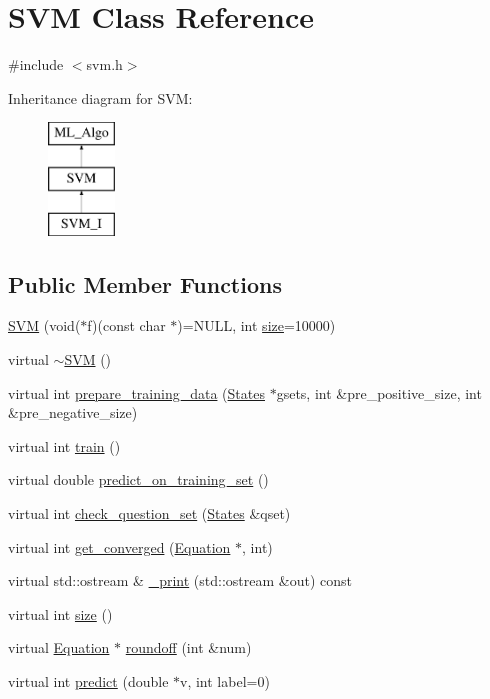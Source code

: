 \hypertarget{classSVM}{}\section{S\+VM Class Reference}
\label{classSVM}


{\ttfamily \#include $<$svm.\+h$>$}

Inheritance diagram for S\+VM\+:\begin{figure}[H]
\begin{center}
\leavevmode
\includegraphics[height=3.000000cm]{classSVM}
\end{center}
\end{figure}
\subsection*{Public Member Functions}
\begin{DoxyCompactItemize}
\item 
\hyperlink{classSVM_ad8716b6d07bd35810f62662856af3a09}{S\+VM} (void($\ast$f)(const char $\ast$)=N\+U\+LL, int \hyperlink{classSVM_a4563cef982f6e1c67acf0c7b0ec8909b}{size}=10000)
\item 
virtual \hyperlink{classSVM_ad2a87ef0f940145f04150e9561f10478}{$\sim$\+S\+VM} ()
\item 
virtual int \hyperlink{classSVM_a930fe217e3affd64acb6700f5f8082e1}{prepare\+\_\+training\+\_\+data} (\hyperlink{classStates}{States} $\ast$gsets, int \&pre\+\_\+positive\+\_\+size, int \&pre\+\_\+negative\+\_\+size)
\item 
virtual int \hyperlink{classSVM_a6a1d895b86522eab683d66ded4d3a049}{train} ()
\item 
virtual double \hyperlink{classSVM_af208fc653a382591f20c0fcf7a186362}{predict\+\_\+on\+\_\+training\+\_\+set} ()
\item 
virtual int \hyperlink{classSVM_aa610ec08173c8603ad6e02f26cbe8e1c}{check\+\_\+question\+\_\+set} (\hyperlink{classStates}{States} \&qset)
\item 
virtual int \hyperlink{classSVM_a712dcd7cb65a8045a77dd474869dd5c4}{get\+\_\+converged} (\hyperlink{classEquation}{Equation} $\ast$, int)
\item 
virtual std\+::ostream \& \hyperlink{classSVM_a6e5a3fbae4da1ecd4773173a2b590c21}{\+\_\+print} (std\+::ostream \&out) const 
\item 
virtual int \hyperlink{classSVM_a4563cef982f6e1c67acf0c7b0ec8909b}{size} ()
\item 
virtual \hyperlink{classEquation}{Equation} $\ast$ \hyperlink{classSVM_abd2d511c6cb9f64a29a4551f6435bfd2}{roundoff} (int \&num)
\item 
virtual int \hyperlink{classSVM_a972215d3c749ba550c85763c8871567f}{predict} (double $\ast$v, int label=0)
\end{DoxyCompactItemize}
